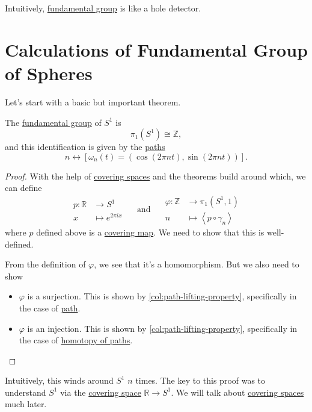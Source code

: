 \begin{prev}
	Intuitively, \hyperref[def:fundamental-group]{fundamental group} is like a hole detector.
\end{prev}

\section{Calculations of Fundamental Group of Spheres}
Let's start with a basic but important theorem.
\begin{theorem}
	The \hyperref[def:fundamental-group]{fundamental group} of \(S^1\) is
	\[
		\pi _1(S^1)\cong \mathbb{Z},
	\]
	and this identification is given by the \hyperref[def:path]{paths}
	\[
		n \leftrightarrow [\omega_{n}(t) = (\cos (2\pi nt), \sin (2\pi nt))].
	\]
\end{theorem}
\begin{proof}
	With the help of \hyperref[def:covering-space]{covering spaces} and the theorems build around which, we can define
	\[
		\begin{split}
			p \colon \mathbb{R} &\to S^1\\
			x &\mapsto e^{2 \pi  i x}
		\end{split}\quad \text{ and }\quad\begin{split}
			\varphi \colon \mathbb{Z} &\to \pi _1(S^1, 1)\\
			n &\mapsto \left< p\circ \gamma _n \right>
		\end{split}
	\]
	where \(p\) defined above is a \hyperref[def:covering-map]{covering map}. We need to show that this is well-defined.

	From the definition of \(\varphi \), we see that it's a homomorphism. But we also need to show
	\begin{itemize}
		\item \(\varphi \) is a surjection. This is shown by \autoref{col:path-lifting-property}, specifically in the case of \hyperref[def:path]{path}.
		\item \(\varphi \) is an injection. This is shown by \autoref{col:path-lifting-property}, specifically in the case of \hyperref[def:homotopy-path]{homotopy of paths}.
	\end{itemize}
\end{proof}
\begin{remark}
	Intuitively, this winds around \(S^1\) \(n\) times. The key to this proof was to understand \(S^1\) via the \hyperref[def:covering-space]{covering space}
	\(\mathbb{R} \to S^1\). We will talk about \hyperref[def:covering-space]{covering spaces} much later.
\end{remark}

